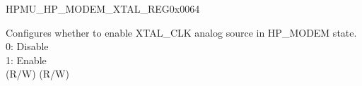 \begin{register}{H}{PMU\_HP\_MODEM\_XTAL\_REG}{0x0064}\label{regdesc:PMUHPMODEMXTALREG}
%
%
\regnewline%
\begin{regdesc}\begin{reglist}
\label{fielddesc:PMUHPMODEMXPDXTAL}\item [PMU\_HP\_MODEM\_XPD\_XTAL] Configures whether to enable XTAL\_CLK analog source in HP\_MODEM state.\\
0: Disable\\
1: Enable\\
(R/W)
(R/W)
\end{reglist}\end{regdesc}
\end{register}


